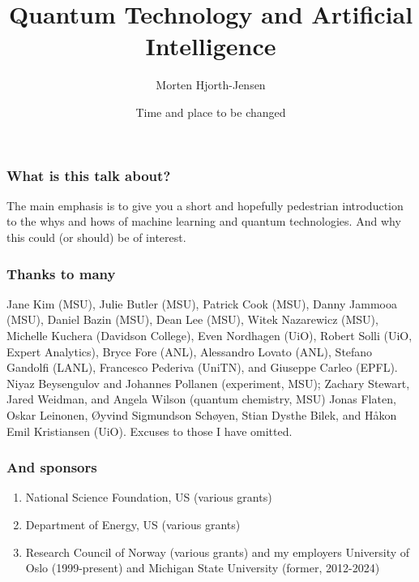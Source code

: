 \documentclass{beamer}
\begin{document}
\title[Quantum Computing and ML]{\textbf{Quantum Technology and Artificial Intelligence}}
\author{Morten Hjorth-Jensen}
\date{Time and place to be changed}





\begin{frame}
\titlepage
\end{frame}

\begin{frame}
\frametitle{What is this talk about?}

\begin{block}{}
The main emphasis is to give you a short and hopefully pedestrian introduction to the whys and hows of machine learning and quantum technologies.
And why this could (or should) be of interest. 
\end{block}

\end{frame}

\begin{frame}
\frametitle{Thanks to many}

Jane Kim (MSU), Julie Butler (MSU), Patrick Cook (MSU), Danny Jammooa (MSU), Daniel Bazin (MSU), Dean Lee (MSU), Witek Nazarewicz (MSU), Michelle Kuchera (Davidson College), Even Nordhagen (UiO), Robert Solli (UiO, Expert Analytics), Bryce Fore (ANL), Alessandro Lovato (ANL), Stefano Gandolfi (LANL), Francesco Pederiva (UniTN), and Giuseppe Carleo (EPFL). 
Niyaz Beysengulov and Johannes Pollanen (experiment, MSU); Zachary Stewart, Jared Weidman, and Angela Wilson (quantum chemistry, MSU)
Jonas Flaten, Oskar Leinonen, Øyvind Sigmundson Schøyen, Stian Dysthe Bilek, and Håkon Emil Kristiansen (UiO). Excuses to those I have omitted.
\end{frame}

\begin{frame}
\frametitle{And sponsors}

\begin{enumerate}
\item National Science Foundation, US (various grants)

\item Department of Energy, US (various grants)

\item Research Council of Norway (various grants) and my employers University of Oslo (1999-present) and Michigan State University (former, 2012-2024)
\end{enumerate}

\end{frame}
\end{document}

